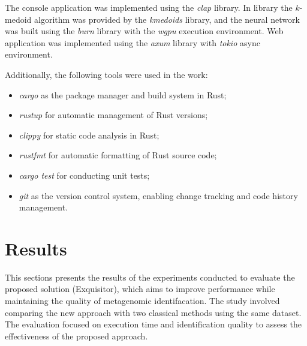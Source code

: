 \documentclass[pdflatex,sn-vancouver-num]{sn-jnl}%
\begin{document}
            The console application was implemented using the \textit{clap} library\cite{Rust:clap}. In library the $k$-medoid algorithm was provided by the \textit{kmedoids} library\cite{Rust:kmedoids}, and the neural network was built using the \textit{burn} library\cite{Rust:burn} with the \textit{wgpu} execution environment. Web application was implemented using the \textit{axum} library\cite{Rust:axum} with \textit{tokio}\cite{Rust:axum} async environment.

            Additionally, the following tools were used in the work:
            \begin{itemize}
                \item \textit{cargo} as the package manager and build system in Rust;
                \item \textit{rustup} for automatic management of Rust versions;
                \item \textit{clippy} for static code analysis in Rust;
                \item \textit{rustfmt} for automatic formatting of Rust source code;
                \item \textit{cargo test} for conducting unit tests;
                \item \textit{git} as the version control system, enabling change tracking and code history management.
            \end{itemize}


                \section{Results}

                This sections presents the results of the experiments conducted to evaluate the proposed solution (Exquisitor), which aims to improve performance while maintaining the quality of metagenomic identifacation. The study involved comparing the new approach with two classical methods using the same dataset. The evaluation focused on execution time and identification quality to assess the effectiveness of the proposed approach.


\end{document}
